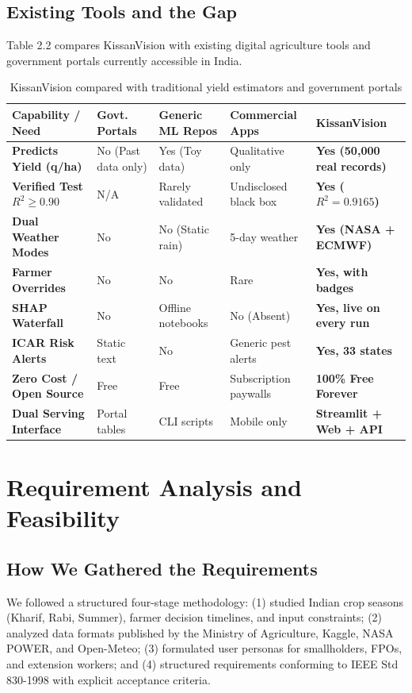 \documentclass[11pt,a4paper]{report}
\begin{document}
\section{Existing Tools and the Gap}
Table 2.2 compares KissanVision with existing digital agriculture tools and government portals currently accessible in India.

\begin{table}[htbp]
\centering
\small
\caption{KissanVision compared with traditional yield estimators and government portals}
\begin{tabularx}{\textwidth}{lXXXX}
\toprule
\textbf{Capability / Need} & \textbf{Govt. Portals} & \textbf{Generic ML Repos} & \textbf{Commercial Apps} & \textbf{KissanVision} \\
\midrule
\textbf{Predicts Yield (q/ha)} & No (Past data only) & Yes (Toy data) & Qualitative only & \textbf{Yes (50,000 real records)} \\
\textbf{Verified Test $R^2 \ge 0.90$} & N/A & Rarely validated & Undisclosed black box & \textbf{Yes ($R^2 = 0.9165$)} \\
\textbf{Dual Weather Modes} & No & No (Static rain) & 5-day weather & \textbf{Yes (NASA + ECMWF)} \\
\textbf{Farmer Overrides} & No & No & Rare & \textbf{Yes, with badges} \\
\textbf{SHAP Waterfall} & No & Offline notebooks & No (Absent) & \textbf{Yes, live on every run} \\
\textbf{ICAR Risk Alerts} & Static text & No & Generic pest alerts & \textbf{Yes, 33 states} \\
\textbf{Zero Cost / Open Source}& Free & Free & Subscription paywalls & \textbf{100\% Free Forever} \\
\textbf{Dual Serving Interface} & Portal tables & CLI scripts & Mobile only & \textbf{Streamlit + Web + API} \\
\bottomrule
\end{tabularx}
\end{table}

\chapter{Requirement Analysis and Feasibility}

\section{How We Gathered the Requirements}
We followed a structured four-stage methodology: (1) studied Indian crop seasons (Kharif, Rabi, Summer), farmer decision timelines, and input constraints; (2) analyzed data formats published by the Ministry of Agriculture, Kaggle, NASA POWER, and Open-Meteo; (3) formulated user personas for smallholders, FPOs, and extension workers; and (4) structured requirements conforming to IEEE Std 830-1998 with explicit acceptance criteria.
\end{document}
